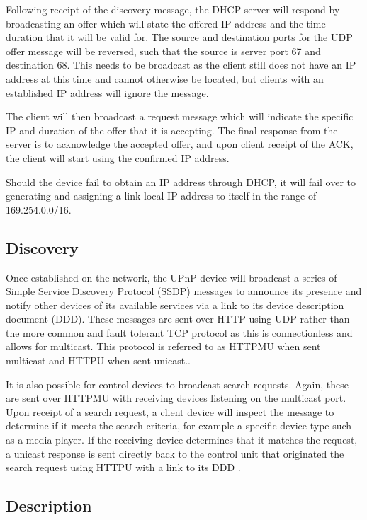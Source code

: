 Following receipt of the discovery message, the DHCP server will respond by broadcasting an offer which will state the offered IP address and the time duration that it will be valid for. The source and destination ports for the UDP offer message will be reversed, such that the source is server port 67 and destination 68. This needs to be broadcast as the client still does not have an IP address at this time and cannot otherwise be located\cite{dhcp}, but clients with an established IP address will ignore the message.

The client will then broadcast a request message which will indicate the specific IP and duration of the offer that it is accepting. The final response from the server is to acknowledge the accepted offer, and upon client receipt of the ACK, the client will start using the confirmed IP address.

Should the device fail to obtain an IP address through DHCP, it will fail over to generating and assigning a link-local IP address to itself in the range of 169.254.0.0/16\cite{palmila2007zeroconf}.

\subsection{Discovery}

Once established on the network, the UPnP device will broadcast a series of Simple Service Discovery Protocol (SSDP)\cite{UPnPWindowsXP} messages to announce its presence and notify other devices of its available services via a link to its device description document (DDD). These messages are sent over HTTP using UDP rather than the more common and fault tolerant TCP protocol as this is connectionless and allows for multicast. This protocol is referred to as HTTPMU when sent multicast and HTTPU when sent unicast.\cite{embeddedinn-upnp-device-arch}.

It is also possible for control devices to broadcast search requests. Again, these are sent over HTTPMU with receiving devices listening on the multicast port. Upon receipt of a search request, a client device will inspect the message to determine if it meets the search criteria, for example a specific device type such as a media player. If the receiving device determines that it matches the request, a unicast response is sent directly back to the control unit that originated the search request using HTTPU with a link to its DDD \cite{UPnPWindowsXP}.

\subsection{Description}

